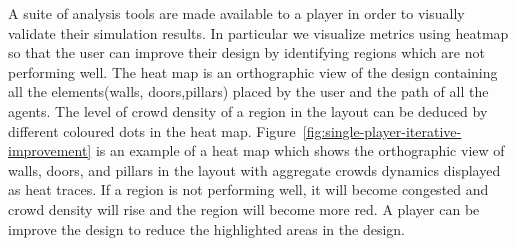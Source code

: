 A suite of analysis tools are made available to a player in order to visually validate their simulation results.  In particular we visualize metrics using heatmap so that the user can improve their design by identifying regions which are not performing well. The heat map is an orthographic view of the design containing all the elements(walls, doors,pillars) placed by the user and the path of all the agents. The level of crowd density of a region in the layout can be deduced by different coloured dots in the heat map. Figure~\ref{fig:single-player-iterative-improvement} is an example of a heat map which shows the orthographic view of walls, doors, and pillars in the layout with aggregate crowds dynamics displayed as heat traces. If a region is not performing well, it will become congested and crowd density will rise and the region will become more red. A player can be improve the design to reduce the highlighted areas in the design.


